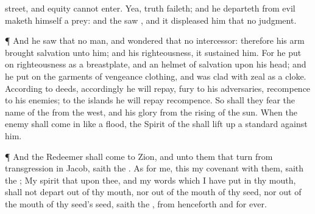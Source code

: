 {street, and
equity
cannot
enter.
Yea,
truth
faileth; and he
{}
departeth from
evil maketh himself a
prey: and the
{}
saw
{}, and it
displeased him that
{} no
judgment.
\par }{\PP {}¶ And he
saw that
{} no
man, and
wondered that
{} no
intercessor: therefore his
arm brought
salvation unto him; and his
righteousness, it
sustained him.
For he put
on
righteousness as a
breastplate, and an
helmet of
salvation upon his
head; and he put
on the
garments of
vengeance
{}
clothing, and was
clad with
zeal as a
cloke.
According
to
{}
deeds, accordingly he will
repay,
fury to his
adversaries,
recompence to his
enemies; to the
islands he will
repay
recompence.
So shall they
fear the
name of the
{} from the
west, and his
glory from the
rising of the
sun. When the
enemy shall come
in like a
flood, the
Spirit of the
{} shall lift up a
standard against him.
\par }{\PP {}¶ And the
Redeemer shall
come to
Zion, and unto them that
turn from
transgression in
Jacob,
saith the
{}.
As for me, this
{} my
covenant with them,
saith the
{}; My
spirit that
{} upon thee, and my
words which I have
put in thy
mouth, shall not
depart out of thy
mouth, nor out of the
mouth of thy
seed, nor out of the
mouth of thy
seed’s
seed,
saith the
{}, from henceforth and
for
ever.

}
